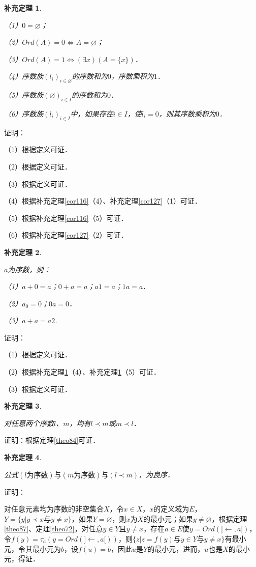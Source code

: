 \documentclass[12pt, a4paper, oneside]{book}
\newtheorem{cor}{补充定理}
\begin{document}
			\begin{cor}\label{cor248}
				\hfill\par
				（1）$0=\varnothing$；
				\par
				（2）$Ord(A)=0\Leftrightarrow A=\varnothing$；
				\par
				（3）$Ord(A)=1\Leftrightarrow (\exists x)(A=\{x\})$．
				\par
				（4）序数族$(l_i)_{i\in \varnothing}$的序数和为$0$，序数乘积为$1$．
				\par
				（5）序数族$(\varnothing)_{i\in I}$的序数和为$0$．
				\par
				（6）序数族$(l_i)_{i\in I}$中，如果存在$i \in I$，使$l_i=0$，则其序数乘积为$0$．
			\end{cor}
			证明：
			\par
			（1）根据定义可证．
			\par
			（2）根据定义可证．
			\par
			（3）根据定义可证．
			\par
			（4）根据补充定理\ref{cor116}（4）、补充定理\ref{cor127}（1）可证．
			\par
			（5）根据补充定理\ref{cor116}（5）可证．
			\par
			（6）根据补充定理\ref{cor127}（2）可证．
			
			\begin{cor}\label{cor249}
				\hfill\par
				$a$为序数，则：
				\par
				（1）$a+0=a$；$0+a=a$；$a1=a$；$1a=a$．
				\par
				（2）$a_0=0$；$0a=0$．
				\par
				（3）$a+a=a2$.
			\end{cor}
			证明：
			\par
			（1）根据定义可证．
			\par
			（2）根据补充定理\ref{cor248}（4）、补充定理\ref{cor248}（5）可证．
			\par
			（3）根据定义可证．
			
			\begin{cor}\label{cor250}
				\hfill\par
				对任意两个序数$l$、$m$，均有$l\prec m$或$m\prec l$．
			\end{cor}
			证明：根据定理\ref{theo84}可证．
			
			\begin{cor}\label{cor251}
				\hfill\par
				公式$(l\text{为序数})\text{与}(m\text{为序数})\text{与}(l\prec m)$，为良序．
			\end{cor}
			证明：
			\par
			对任意元素均为序数的非空集合$X$，令$x\in X$，$x$的定义域为$E$，$Y=\{y|y\prec x\text{与}y\neq x\}$，如果$Y=\varnothing$，则$x$为$X$的最小元；如果$y\neq \varnothing$，根据定理\ref{theo87}、定理\ref{theo72}，对任意$y\in Y$且$y\neq x$，存在$a\in E$使$y=Ord(]\gets, a[)$，令$f(y)=\tau_a(y=Ord(]\gets, a[))$，则$\{z|z=f(y)\text{与}y\in Y\text{与}y\neq x\}$有最小元，令其最小元为$b$，设$f(u)=b$，因此$u$是$Y$的最小元，进而，$u$也是$X$的最小元，得证．
	
\end{document}
